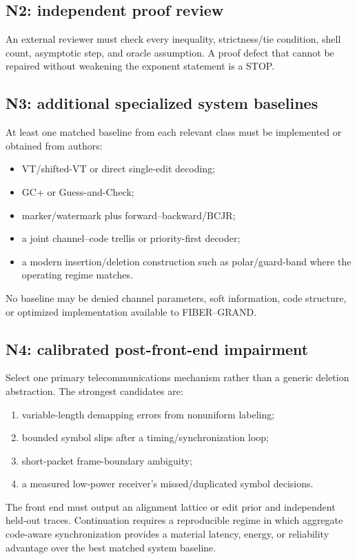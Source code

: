 \documentclass[11pt]{article}
\theoremstyle{definition}
\theoremstyle{remark}
\begin{document}
\subsection{N2: independent proof review}
An external reviewer must check every inequality, strictness/tie condition, shell count, asymptotic step, and oracle assumption.  A proof defect that cannot be repaired without weakening the exponent statement is a STOP.

\subsection{N3: additional specialized system baselines}
At least one matched baseline from each relevant class must be implemented or obtained from authors:
\begin{itemize}[leftmargin=2em]
\item VT/shifted-VT or direct single-edit decoding;
\item GC+ or Guess-and-Check;
\item marker/watermark plus forward--backward/BCJR;
\item a joint channel--code trellis or priority-first decoder;
\item a modern insertion/deletion construction such as polar/guard-band where the operating regime matches.
\end{itemize}
No baseline may be denied channel parameters, soft information, code structure, or optimized implementation available to FIBER--GRAND.

\subsection{N4: calibrated post-front-end impairment}
Select one primary telecommunications mechanism rather than a generic deletion abstraction.  The strongest candidates are:
\begin{enumerate}[leftmargin=2em]
\item variable-length demapping errors from nonuniform labeling;
\item bounded symbol slips after a timing/synchronization loop;
\item short-packet frame-boundary ambiguity;
\item a measured low-power receiver's missed/duplicated symbol decisions.
\end{enumerate}
The front end must output an alignment lattice or edit prior and independent held-out traces.  Continuation requires a reproducible regime in which aggregate code-aware synchronization provides a material latency, energy, or reliability advantage over the best matched system baseline.
\end{document}
